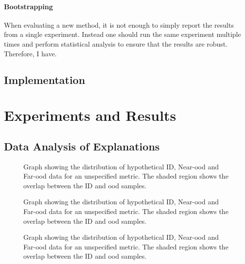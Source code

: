 \documentclass[UKenglish]{uiomasterthesis} %
\theoremstyle{definition}
\begin{document}
\subsubsection{Bootstrapping}

When evaluating a new method, it is not enough to simply report the results from a single experiment. Instead one should run the same experiment multiple times and perform statistical analysis to ensure that the results are robust. Therefore, I have.

\section{Implementation}

\chapter{Experiments and Results} \label{chapter:experiments}

\section{Data Analysis of Explanations}

\begin{figure}
    \label{fig:lime}
    \begin{center}
        
    \end{center}
    \caption[Hypothetical ID/\ac{ood} distributions for an \ac{ood} detection metric]{Graph showing the distribution of hypothetical ID, Near-\ac{ood} and Far-\ac{ood} data for an unspecified metric. The shaded region shows the overlap between the ID and \ac{ood} samples.}
\end{figure}

\begin{figure}
    \label{fig:lime}
    \begin{center}
        
    \end{center}
    \caption[Hypothetical ID/\ac{ood} distributions for an \ac{ood} detection metric]{Graph showing the distribution of hypothetical ID, Near-\ac{ood} and Far-\ac{ood} data for an unspecified metric. The shaded region shows the overlap between the ID and \ac{ood} samples.}
\end{figure}


\begin{figure}
    \label{fig:gradcam}
    \begin{center}
        
    \end{center}
    \caption[Hypothetical ID/\ac{ood} distributions for an \ac{ood} detection metric]{Graph showing the distribution of hypothetical ID, Near-\ac{ood} and Far-\ac{ood} data for an unspecified metric. The shaded region shows the overlap between the ID and \ac{ood} samples.}
\end{figure}
\end{document}
